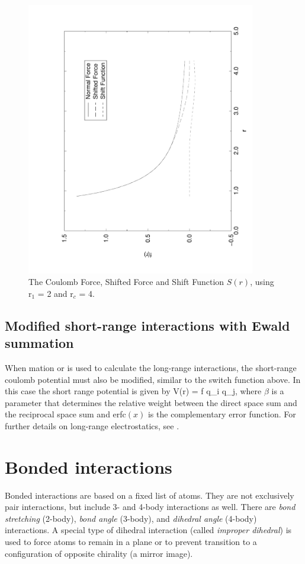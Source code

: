 \begin{figure}
\centerline{\includegraphics[angle=270,width=10cm]{plots/shiftf}}
\caption[The Coulomb Force, Shifted Force and Shift Function
$S(r)$,.]{The Coulomb Force, Shifted Force and Shift Function $S(r)$,
using r$_1$ = 2 and r$_c$ = 4.} 
\label{fig:shift}
\end{figure}

\subsection{Modified short-range interactions with Ewald summation}
When mation or  is used to calculate the
long-range interactions, the 
short-range coulomb potential must also be modified, similar to the
switch function above. In this case the short range potential is given
by
\beq
V(r) = f  q_i q_j,
\eeq
where $\beta$ is a parameter that determines the relative weight 
between the direct space sum and the reciprocal space sum and erfc$(x)$ is
the complementary error function. For further 
details on long-range electrostatics, see .


\section{Bonded interactions}
Bonded interactions are based on a fixed list of atoms. They are not
exclusively pair interactions, but include 3- and 4-body interactions
as well. There are {\em bond stretching} (2-body), {\em bond angle}
(3-body), and {\em dihedral angle} (4-body) interactions. A special
type of dihedral interaction (called {\em improper dihedral}) is used
to force atoms to remain in a plane or to prevent transition to a
configuration of opposite chirality (a mirror image).

